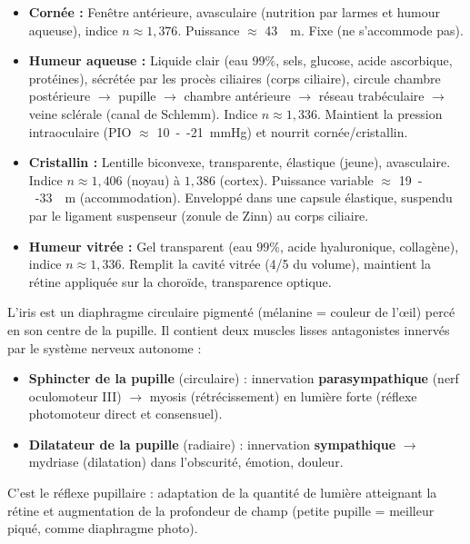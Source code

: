 \documentclass[11pt]{article}
\newcommand{\cle}[1]{{\popxbold\color{popdark}#1}}
\begin{document}
\begin{propriete}
\begin{itemize}
\item \textbf{Cornée :} Fenêtre antérieure, avasculaire (nutrition par larmes et humour aqueuse), indice $n \approx 1,376$. Puissance $\approx$ \SI{43}{\per\meter}. Fixe (ne s'accommode pas).
\item \textbf{Humeur aqueuse :} Liquide clair (eau $99\%$, sels, glucose, acide ascorbique, protéines), sécrétée par les procès ciliaires (corps ciliaire), circule chambre postérieure $\to$ pupille $\to$ chambre antérieure $\to$ réseau trabéculaire $\to$ veine sclérale (canal de Schlemm). Indice $n \approx 1,336$. Maintient la pression intraoculaire (PIO $\approx$ \SI{10}{--}\SI{21}{mmHg}) et nourrit cornée/cristallin.
\item \textbf{Cristallin :} Lentille biconvexe, transparente, élastique (jeune), avasculaire. Indice $n \approx 1,406$ (noyau) à $1,386$ (cortex). Puissance variable $\approx$ \SI{19}{--}\SI{33}{\per\meter} (accommodation). Enveloppé dans une capsule élastique, suspendu par le \cle{ligament suspenseur (zonule de Zinn)} au corps ciliaire.
\item \textbf{Humeur vitrée :} Gel transparent (eau $99\%$, acide hyaluronique, collagène), indice $n \approx 1,336$. Remplit la cavité vitrée (4/5 du volume), maintient la rétine appliquée sur la choroïde, transparence optique.
\end{itemize}
\end{propriete}

\begin{aretenir}
L'iris est un diaphragme circulaire pigmenté (mélanine = couleur de l'œil) percé en son centre de la \cle{pupille}. Il contient deux muscles lisses antagonistes innervés par le système nerveux autonome :
\begin{itemize}
\item \textbf{Sphincter de la pupille} (circulaire) : innervation \textbf{parasympathique} (nerf oculomoteur III) $\to$ \cle{myosis} (rétrécissement) en lumière forte (réflexe photomoteur direct et consensuel).
\item \textbf{Dilatateur de la pupille} (radiaire) : innervation \textbf{sympathique} $\to$ \cle{mydriase} (dilatation) dans l'obscurité, émotion, douleur.
\end{itemize}
C'est le \cle{réflexe pupillaire} : adaptation de la quantité de lumière atteignant la rétine et augmentation de la profondeur de champ (petite pupille = meilleur piqué, comme diaphragme photo).
\end{aretenir}
\end{document}
